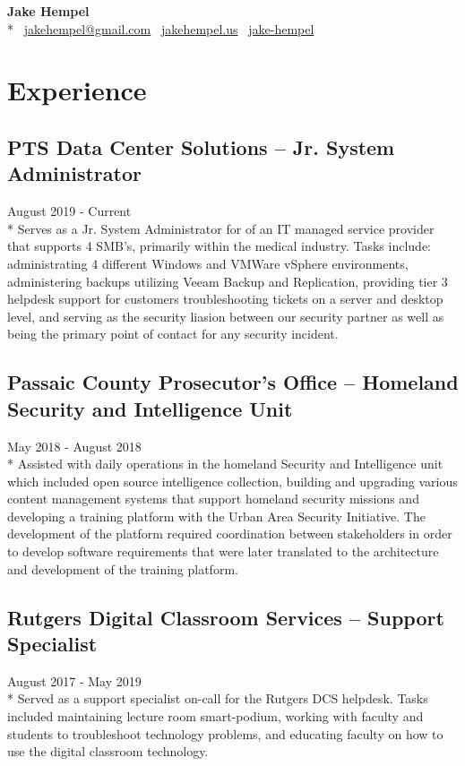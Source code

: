 \documentclass{article}
\begin{document}
\begin{samepage}
\begin{center}
\huge{\textbf{Jake Hempel}} \\*
\large{\faEnvelope \, \href{mailto:jakehempel@gmail.com}{jakehempel@gmail.com}
\faGlobe \, \href{https://jakehempel.us}{jakehempel.us}}
\faLinkedinSquare \, \href{https://www.linkedin.com/in/jake-hempel/}{jake-hempel}
\end{center}

\section{Experience}

\subsection{PTS Data Center Solutions -- Jr. System Administrator}
August 2019 - Current\\*
Serves as a Jr. System Administrator for of an IT managed service provider that supports 4 SMB's, primarily within the medical industry. Tasks include: administrating 4 different Windows and VMWare vSphere environments, administering backups utilizing Veeam Backup and Replication, providing tier 3 helpdesk support for customers troubleshooting tickets on a server and desktop level, and serving as the security liasion between our security partner as well as being the primary point of contact for any security incident.

\subsection{Passaic County Prosecutor's Office -- Homeland Security and Intelligence Unit}
May 2018 - August 2018\\*
Assisted with daily operations in the homeland Security and Intelligence unit which included open source intelligence collection, building and upgrading various content management systems that support homeland security missions and developing a training platform with the Urban Area Security Initiative.  The development of the platform required coordination between stakeholders in order to develop software requirements that were later translated to the architecture and development of the training platform.

\subsection{Rutgers Digital Classroom Services -- Support Specialist}
August 2017 - May 2019\\*
Served as a support specialist on-call for the Rutgers DCS helpdesk. Tasks included maintaining lecture room smart-podium, working with faculty and students to troubleshoot technology problems, and educating faculty on how to use the digital classroom technology.


\end{samepage}
\end{document}
